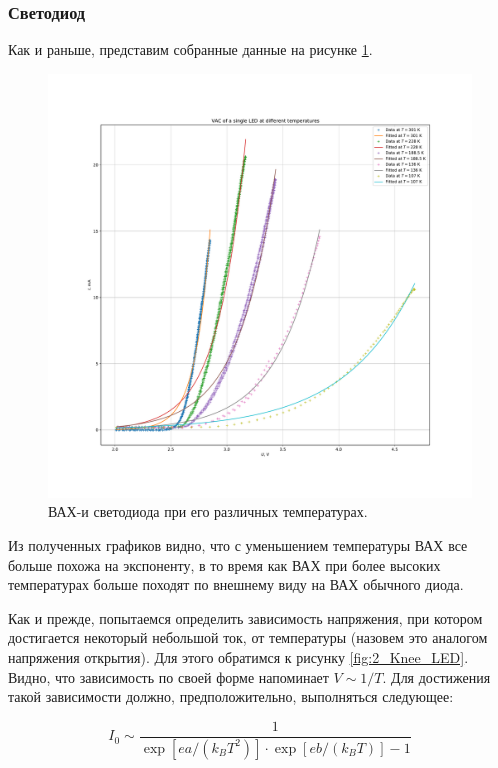 \documentclass[a4paper, 12pt]{article}
\begin{document}
\subsubsection{Светодиод}

Как и раньше, представим собранные данные на рисунке \ref{fig:2_LED}.

\begin{figure}[H]
	\centering
	\includegraphics[width=\linewidth]{2_LED}
	\caption{ВАХ-и светодиода при его различных температурах.}
	\label{fig:2_LED}
\end{figure}

Из полученных графиков видно, что с уменьшением температуры ВАХ все больше похожа на экспоненту, в то время как ВАХ при более высоких температурах больше походят по внешнему виду на ВАХ обычного диода.

Как и прежде, попытаемся определить зависимость напряжения, при котором достигается некоторый небольшой ток, от температуры (назовем это аналогом напряжения открытия). Для этого обратимся к рисунку \ref{fig:2_Knee_LED}. Видно, что зависимость по своей форме напоминает $V\sim 1 / T$. Для достижения такой зависимости должно, предположительно, выполняться следующее:

\begin{equation}
	I_0 \sim \frac{1}{\exp[e a / (k_B T^2)] \cdot \exp[e b / (k_B T)] - 1}
\end{equation}
\end{document}
